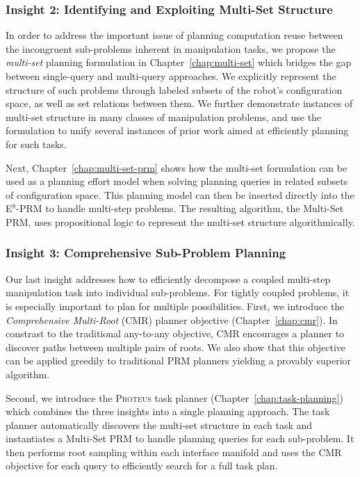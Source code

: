 \subsubsection*{Insight 2: Identifying and Exploiting Multi-Set
   Structure}

In order to address the important issue of planning computation
reuse between the incongruent sub-problems inherent in manipulation
tasks,
we propose the \emph{multi-set} planning formulation
in Chapter~\ref{chap:multi-set}
which bridges the gap between single-query and multi-query approaches.
We explicitly represent the structure of such problems
through labeled subsets of the robot's configuration space,
as well as set relations between them.
We further demonstrate instances of multi-set structure
in many classes of manipulation problems,
and use the formulation to unify several instances of
prior work aimed at efficiently planning for such tasks.

Next, Chapter~\ref{chap:multi-set-prm}
shows how the multi-set formulation can be used as a
planning effort model
when solving planning queries in related subsets of configuration space.
This planning model can then be inserted directly into the 
E$^8$-PRM to handle multi-step problems.
The resulting algorithm,
the Multi-Set PRM,
uses propositional logic to represent the multi-set structure
algorithmically.

\subsubsection*{Insight 3: Comprehensive Sub-Problem Planning}

Our last insight addresses how to efficiently decompose a coupled
multi-step manipulation task into individual sub-problems.
For tightly coupled problems,
it is especially important to plan for multiple possibilities.
First, we introduce the \emph{Comprehensive Multi-Root} (CMR) planner
objective (Chapter~\ref{chap:cmr}).
In constrast to the traditional any-to-any objective,
CMR encourages a planner to discover paths between multiple pairs of
roots.
We also show that this objective can be applied greedily
to traditional PRM planners
yielding a provably superior algorithm. 

Second,
we introduce the \textsc{Proteus} task planner
(Chapter~\ref{chap:task-planning})
which combines the three insights into a single planning approach.
The task planner
automatically discovers the multi-set structure in each task
and instantiates a Multi-Set PRM to handle planning queries
for each sub-problem.
It then performs root sampling within each interface manifold
and uses the CMR objective for each query to
efficiently search for a full task plan.


